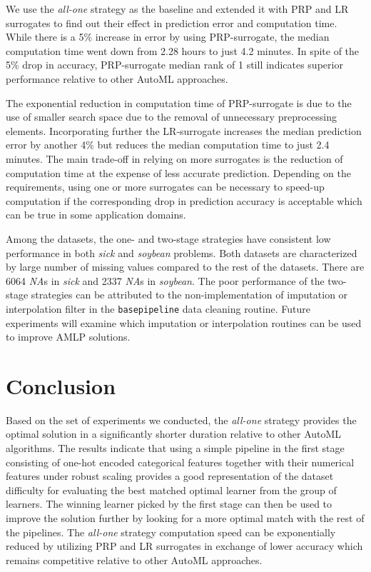 \documentclass{juliacon}
\begin{document}
\vskip 6pt

We use the \emph{all-one} strategy as the baseline and extended it with 
PRP and LR surrogates to find out their effect in prediction error
and computation time. While there is a 5\% increase in error by
using PRP-surrogate, the median computation time went down from 2.28
hours to just 4.2 minutes. In spite of the 5\% drop in accuracy,
PRP-surrogate median rank of 1 still indicates superior performance
relative to other AutoML approaches.

\vskip 6pt

The exponential reduction in computation time of PRP-surrogate 
is due to the use of smaller search space due to the removal of unnecessary 
preprocessing elements. Incorporating further the LR-surrogate
increases the median prediction error by another 4\% 
but reduces the median computation time to just 2.4 minutes. 
The main trade-off in relying on more surrogates is the reduction of 
computation time at the expense of less accurate prediction. 
Depending on the requirements, using one or more surrogates 
can be necessary to speed-up computation if the corresponding drop in 
prediction accuracy is acceptable which can be true in some 
application domains.

\vskip 6pt

Among the datasets, the one- and two-stage strategies have consistent low performance in
both \emph{sick} and \emph{soybean} problems.  Both datasets are characterized
by large number of missing values compared to the rest of the datasets.
There are 6064 \emph{NA}s in \emph{sick} and 2337 \emph{NA}s in
\emph{soybean}. The poor performance of the two-stage strategies
can be attributed to the non-implementation of imputation or
interpolation filter in the \texttt{basepipeline} data
cleaning routine. Future experiments
will examine which imputation or interpolation routines
can be used to improve AMLP solutions.

\section{Conclusion}

Based on the set of experiments we conducted, 
the \emph{all-one} strategy provides the optimal solution in 
a significantly shorter duration relative to other
AutoML algorithms. The results indicate that using a simple pipeline
in the first stage consisting of one-hot encoded categorical 
features together with their numerical features
under robust scaling provides a good representation of the dataset difficulty
for evaluating the best matched optimal learner from the group of learners.
The winning learner picked by the first stage can then be used to improve the
solution further by looking for a more optimal match with the rest of the
pipelines. The \emph{all-one} strategy computation speed can be exponentially 
reduced by utilizing PRP and LR surrogates in exchange of lower accuracy
which remains competitive relative to other AutoML approaches.
\end{document}
